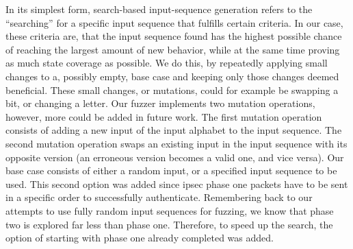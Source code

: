 In its simplest form, search-based input-sequence generation refers to the ``searching'' for a specific input sequence that fulfills certain criteria. In our case, these criteria are, that the input sequence found has the highest possible chance of reaching the largest amount of new behavior, while at the same time proving as much state coverage as possible. We do this, by repeatedly applying small changes to a, possibly empty, base case and keeping only those changes deemed beneficial. These small changes, or mutations, could for example be swapping a bit, or changing a letter. Our fuzzer implements two mutation operations, however, more could be added in future work. The first mutation operation consists of adding a new input of the input alphabet to the input sequence. The second mutation operation swaps an existing input in the input sequence with its opposite version (an erroneous version becomes a valid one, and vice versa). Our base case consists of either a random input, or a specified input sequence to be used. This second option was added since \ac{ipsec} phase one packets have to be sent in a specific order to successfully authenticate. Remembering back to our attempts to use fully random input sequences for fuzzing, we know that phase two is explored far less than phase one. Therefore, to speed up the search, the option of starting with phase one already completed was added.

